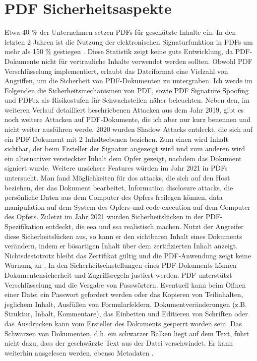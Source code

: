 \section{PDF Sicherheitsaspekte}
Etwa 40 \% der Unternehmen setzen PDFs für geschützte Inhalte ein. In den letzten 2 Jahren ist die Nutzung der elektronischen Signaturfunktion in PDFs um mehr als 150 \% gestiegen \cite{formilo}. Diese Statistik zeigt keine gute Entwicklung, da PDF-Dokumente nicht für vertrauliche Inhalte verwendet werden sollten. Obwohl PDF Verschlüsselung implementiert, erlaubt das Dateiformat eine Vielzahl von Angriffen, um die Sicherheit von PDF-Dokumenten zu untergraben. Ich werde im Folgenden die Sicherheitsmechanismen von PDF, sowie PDF Signature Spoofing und PDFex als Risikostufen für Schwachstellen näher beleuchten. Neben den, im weiteren Verlauf detailliert beschriebenen Attacken aus dem Jahr 2019, gibt es noch weitere Attacken auf PDF-Dokumente, die ich aber nur kurz benennen und nicht weiter ausführen werde. 2020 wurden Shadow Attacks entdeckt, die sich auf ein PDF Dokument mit 2 Inhaltsebenen beziehen. Zum einen wird Inhalt sichtbar, der beim Ersteller der Signatur angezeigt wird und zum anderen wird ein alternativer versteckter Inhalt dem Opfer gezeigt, nachdem das Dokument signiert wurde. Weitere unsichere Features würden im Jahr 2021 in PDFs untersucht. Man fand Möglichkeiten für \gls{dos} attacks, die sich auf den Host beziehen, der das Dokument bearbeitet, Information disclosure attacks, die persönliche Daten aus dem Computer des Opfers freilegen können, data manipulation auf dem System des Opfers und code execution auf dem Computer des Opfers. Zuletzt im Jahr 2021 wurden Sicherheitslücken in der PDF-Spezifikation entdeckt, die \gls{eea} und \gls{ssa} realistisch machen. Nutzt der Angreifer diese Sicherheitslücken aus, so kann er den sichtbaren Inhalt eines Dokuments verändern, indem er bösartigen Inhalt über dem zertifizierten Inhalt anzeigt. Nichtsdestotrotz bleibt das Zertifikat gültig und die PDF-Anwendung zeigt keine Warnung an \cite{pdf-insec}. In den Sicherheitseinstellungen eines PDF-Dokuments können Dokumentensicherheit und Zugriffsregeln justiert werden. PDF unterstützt Verschlüsselung und die Vergabe von Passwörtern. Eventuell kann beim Öffnen einer Datei ein Passwort gefordert werden oder das Kopieren von Teilinhalten, jeglichem Inhalt, Ausfüllen von Formularfeldern, Dokumentveränderungen (z.B. Struktur, Inhalt, Kommentare), das Einbetten und Editieren von Schriften oder das Ausdrucken kann vom Ersteller des Dokuments gesperrt worden sein. Das Schwärzen von Dokumenten, d.h. ein schwarzer Balken liegt auf dem Text, führt nicht dazu, dass der geschwärzte Text aus der Datei verschwindet. Er kann weiterhin ausgelesen werden, ebenso Metadaten \cite{adobe-pdf-pades}. 

